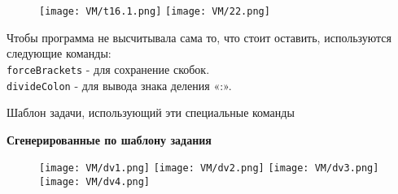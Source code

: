 \begin{figure}[h]
		\centering
		\texttt{[image: VM/t16.1.png]}
		\texttt{[image: VM/22.png]}
\end{figure}

 Чтобы программа не высчитывала сама то, что стоит оставить, используются следующие команды:
\\ \texttt{forceBrackets} - для сохранение скобок.
\\ \texttt{divideColon} - для вывода знака деления «:».

Шаблон задачи, использующий эти специальные команды



\textbf{Сгенерированные по шаблону задания}

		\begin{figure}[h]
		\centering
		\texttt{[image: VM/dv1.png]}
		\texttt{[image: VM/dv2.png]}
		\texttt{[image: VM/dv3.png]}
		\texttt{[image: VM/dv4.png]}
\end{figure}

